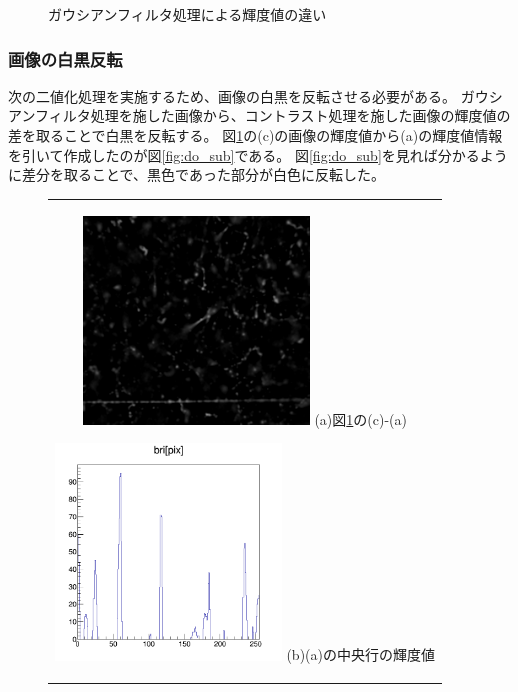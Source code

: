 \documentclass[12pt,a4paper]{jarticle}
\begin{document}
\begin{figure}[htbp]
\begin{center}
\begin{tabular}{c}
      \end{tabular}
      \caption{ガウシアンフィルタ処理による輝度値の違い\label{fig:do_gau_beforeandafter}}
    \end{center}
\end{figure}
\subsubsection{画像の白黒反転}
次の二値化処理を実施するため、画像の白黒を反転させる必要がある。
ガウシアンフィルタ処理を施した画像から、コントラスト処理を施した画像の輝度値の差を取ることで白黒を反転する。
図\ref{fig:do_gau_beforeandafter}の(c)の画像の輝度値から(a)の輝度値情報を引いて作成したのが図\ref{fig:do_sub}である。
図\ref{fig:do_sub}を見れば分かるように差分を取ることで、黒色であった部分が白色に反転した。
\begin{figure}[htbp]
    \begin{center}
      \begin{tabular}{c}
        \begin{minipage}{0.5\hsize}
          \begin{center}
            \includegraphics[clip, width=60mm]{sub.png}
            \hspace{1.6cm} (a)図\ref{fig:do_gau_beforeandafter}の(c)-(a)
          \end{center}
        \end{minipage}

        \begin{minipage}{0.5\hsize}
          \begin{center}
            \includegraphics[clip, width=60mm]{sub_hist.png}
            \hspace{1.6cm} (b)(a)の中央行の輝度値
          \end{center}
        \end{minipage}
    

\end{tabular}
\end{center}
\end{figure}
\end{document}
